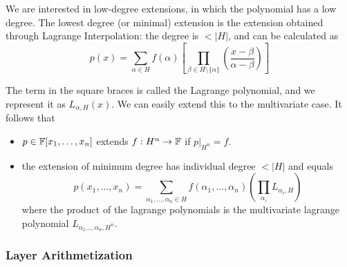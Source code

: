 We are interested in low-degree extensions, in which the polynomial has a low degree. The lowest degree (or minimal) extension is the extension obtained through Lagrange Interpolation: the degree is $<|H|$, and can be calculated as
$$p(x)=\sum_{\alpha\in H}f(\alpha)\left[\prod_{\beta\in H\setminus\{\alpha\}}\left(\frac{x-\beta}{\alpha-\beta}\right)\right]$$

The term in the square braces is called the Lagrange polynomial, and we represent it as $L_{\alpha,H}(x)$. We can easily extend this to the multivariate case. It follows that
\begin{itemize}
	\item $p\in\mathbb{F}[x_1,\dots,x_n]$ extends $f:H^n\rightarrow\mathbb{F}$ if $p|_{H^n}=f$.
	\item the extension of minimum degree has individual degree $<|H|$ and equals
	 $$p(x_1,\dots,x_n)=\sum_{\alpha_1,\dots,\alpha_n\in H}f(\alpha_1,\dots,\alpha_n)\left(\prod_{\alpha_i}L_{\alpha_i,H}\right)$$
	 where the product of the lagrange polynomials is the multivariate lagrange polynomial $L_{\alpha_1\dots,\alpha_n, H^n}$.
\end{itemize}

\subsubsection{Layer Arithmetization}
